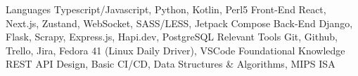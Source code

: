 
\begin{cvskills}
  \cvskill
    {Languages} %
    {Typescript/Javascript, Python, Kotlin, Perl5} %
  \cvskill
    {Front-End}
    {React, Next.js, Zustand, WebSocket, SASS/LESS, Jetpack Compose}
  \cvskill
    {Back-End} %
    {Django, Flask, Scrapy, Express.js, Hapi.dev, PostgreSQL} %
  \cvskill
    {Relevant Tools}  %
    {Git, Github, Trello, Jira, Fedora 41 (Linux Daily Driver), VSCode} %
  \cvskill
    {Foundational Knowledge}
    {REST API Design, Basic CI/CD, Data Structures \& Algorithms, MIPS ISA}
\end{cvskills}

